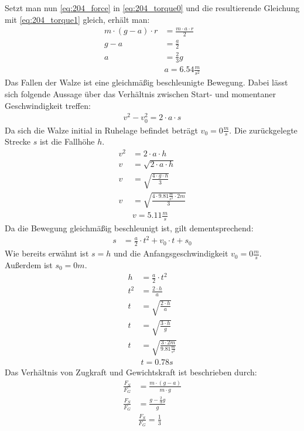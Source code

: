 Setzt man nun \eqref{eq:204_force} in \eqref{eq:204_torque0} und die resultierende Gleichung mit \eqref{eq:204_torque1} gleich, erhält man:
\begin{align*}
    m\cdot(g-a)\cdot r&=\frac{m\cdot a\cdot r}{2}\\
    g-a&=\frac{a}{2}\\
    a&=\frac{2}{3}g\\
    &\boxed{a=6.54\frac{m}{s^2}}	\tag{a}\label{eq:204_a}
\end{align*}
Das Fallen der Walze ist eine gleichmäßig beschleunigte Bewegung. Dabei lässt sich folgende Aussage über das Verhältnis zwischen Start- und momentaner Geschwindigkeit treffen:
\begin{align*}
    v^2-v_0^2=2\cdot a\cdot s
\end{align*}
Da sich die Walze initial in Ruhelage befindet beträgt $v_0=0\frac{m}{s}$. Die zurückgelegte Strecke $s$ ist die Fallhöhe $h$.
\begin{align*}
    v^2&=2\cdot a\cdot h\\
    v&=\sqrt{2\cdot a\cdot h}\\
    v&=\sqrt{\frac{4\cdot g \cdot h}{3}}\\
    v&=\sqrt{\frac{4\cdot 9.81\frac{m}{s^2} \cdot 2m}{3}}\\
    &\boxed{v=5.11\frac{m}{s}}	\tag{b}	\label{eq:204_b}
\end{align*}
Da die Bewegung gleichmäßig beschleunigt ist, gilt dementsprechend:
\begin{align*}
    s&=\frac{a}{2}\cdot t^2+v_0\cdot t+s_0
\end{align*}
\newpage
Wie bereits erwähnt ist $s=h$ und die Anfangsgeschwindigkeit $v_0=0\frac{m}{s}$. Außerdem ist $s_0=0m$.
\begin{align*}
    h&=\frac{a}{2}\cdot t^2\\
    t^2&=\frac{2\cdot h}{a}\\
    t&=\sqrt{\frac{2\cdot h}{a}}\\
    t&=\sqrt{\frac{3\cdot h}{g}}\\
    t&=\sqrt{\frac{3\cdot 2m}{9.81\frac{m}{s^2}}}\\
    &\boxed{t=0.78s}	\tag{c}	\label{eq:204_c}
\end{align*}
Das Verhältnis von Zugkraft und Gewichtskraft ist beschrieben durch:
\begin{align*}
    \frac{F_S}{F_G}&=\frac{m\cdot(g-a)}{m\cdot g}\\
    \frac{F_S}{F_G}&=\frac{g-\frac{2}{3}g}{g}\\
    &\boxed{\frac{F_S}{F_G}=\frac{1}{3}}	\tag{d}	\label{eq:204_d}
\end{align*}